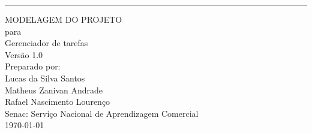 \documentclass{scrreprt}
\date{}
\def\myversion{1.0}
\begin{document}
\begin{flushright}
    \rule{16cm}{5pt}\vskip1cm
    \begin{bfseries}
        \Huge{\uppercase{Modelagem do projeto}}\\
        \vspace{1.2cm}
        para\\
        \vspace{1.2cm}
        Gerenciador de tarefas\\
        \vspace{1.2cm}
        \LARGE{Versão \myversion}\\
        \vspace{1.2cm}
        Preparado por:  \\Lucas da Silva Santos\\Matheus Zanivan Andrade\\Rafael Nascimento Lourenço\\
        \vspace{1.2cm}
        Senac: Serviço Nacional de Aprendizagem Comercial\\
        \vspace{1.2cm}
        \today\\
    \end{bfseries}
\end{flushright}

\tableofcontents







\printglossary
\end{document}
